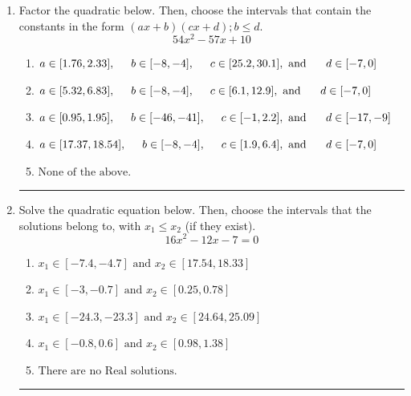\documentclass[14pt]{extbook}
\newcommand{\litem}[1]{\item#1\hspace*{-1cm}\rule{\textwidth}{0.4pt}}
\begin{document}
\begin{enumerate}
{\begin{enumerate}[label=\Alph*.]
\end{enumerate} }
\litem{
Factor the quadratic below. Then, choose the intervals that contain the constants in the form $(ax+b)(cx+d); b \leq d.$\[ 54x^{2} -57 x + 10 \]\begin{enumerate}[label=\Alph*.]
\item \( a \in [1.76, 2.33], \hspace*{5mm} b \in [-8, -4], \hspace*{5mm} c \in [25.2, 30.1], \text{ and } \hspace*{5mm} d \in [-7, 0] \)
\item \( a \in [5.32, 6.83], \hspace*{5mm} b \in [-8, -4], \hspace*{5mm} c \in [6.1, 12.9], \text{ and } \hspace*{5mm} d \in [-7, 0] \)
\item \( a \in [0.95, 1.95], \hspace*{5mm} b \in [-46, -41], \hspace*{5mm} c \in [-1, 2.2], \text{ and } \hspace*{5mm} d \in [-17, -9] \)
\item \( a \in [17.37, 18.54], \hspace*{5mm} b \in [-8, -4], \hspace*{5mm} c \in [1.9, 6.4], \text{ and } \hspace*{5mm} d \in [-7, 0] \)
\item \( \text{None of the above.} \)

\end{enumerate} }
\litem{
Solve the quadratic equation below. Then, choose the intervals that the solutions belong to, with $x_1 \leq x_2$ (if they exist).\[ 16x^{2} -12 x -7 = 0 \]\begin{enumerate}[label=\Alph*.]
\item \( x_1 \in [-7.4, -4.7] \text{ and } x_2 \in [17.54, 18.33] \)
\item \( x_1 \in [-3, -0.7] \text{ and } x_2 \in [0.25, 0.78] \)
\item \( x_1 \in [-24.3, -23.3] \text{ and } x_2 \in [24.64, 25.09] \)
\item \( x_1 \in [-0.8, 0.6] \text{ and } x_2 \in [0.98, 1.38] \)
\item \( \text{There are no Real solutions.} \)


\end{enumerate}}
\end{enumerate}
\end{document}
